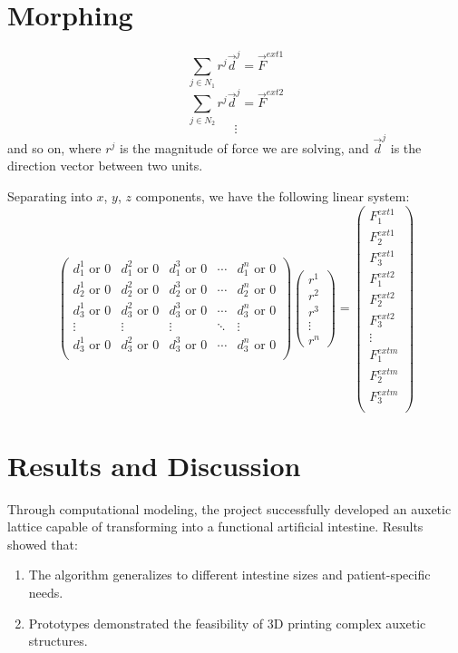 \documentclass{article}
\begin{document}
\section{Morphing}
$$\sum_{j \in N_1} r^j \vec{d}^{j} = \vec{F}^{ext1}$$
$$\sum_{j \in N_2} r^j \vec{d}^{j} = \vec{F}^{ext2}$$
$$\vdots$$
and so on, where $r^j$ is the magnitude of force we are solving, and $\vec{d}^j$ is the direction vector between two units.

Separating into $x$, $y$, $z$ components, we have the following linear system:
$$\begin{pmatrix}
  d^{1}_1 \text{ or 0} & d^{2}_1 \text{ or 0} & d^{3}_1 \text{ or 0} & \cdots & d^{n}_1 \text{ or 0} \\
  d^{1}_2 \text{ or 0} & d^{2}_2 \text{ or 0} & d^{3}_2 \text{ or 0} & \cdots & d^{n}_2 \text{ or 0} \\
  d^{1}_3 \text{ or 0} & d^{2}_3 \text{ or 0} & d^{3}_3 \text{ or 0} & \cdots & d^{n}_3 \text{ or 0} \\
  \vdots & \vdots & \vdots & \ddots & \vdots \\
  d^{1}_3 \text{ or 0} & d^{2}_3 \text{ or 0} & d^3_3 \text{ or 0} & \cdots & d^n_3 \text{ or 0} \\
\end{pmatrix}
\begin{pmatrix}
  r^1 \\
  r^2 \\
  r^3 \\
  \vdots \\
  r^n
\end{pmatrix}
= \begin{pmatrix}
  F^{ext1}_1 \\
  F^{ext1}_2 \\
  F^{ext1}_3 \\
  F^{ext2}_1 \\
  F^{ext2}_2 \\
  F^{ext2}_3 \\
  \vdots \\
  F^{extm}_1 \\
  F^{extm}_2 \\
  F^{extm}_3 \\
\end{pmatrix}$$

\section{Results and Discussion}
Through computational modeling, the project successfully developed an auxetic
lattice capable of transforming into a functional artificial intestine. Results
showed that:
\begin{enumerate}
  \item The algorithm generalizes to different intestine sizes and patient-specific needs.
  \item Prototypes demonstrated the feasibility of 3D printing complex auxetic structures.
\end{enumerate}
\end{document}
